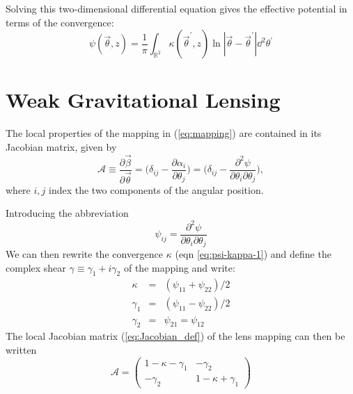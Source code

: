 Solving this two-dimensional differential equation gives the effective potential in terms of the convergence:
\begin{equation}
  \label{eq:psi-kappa}
  \psi(\vec{\theta},z) 
  = \frac{1}{\pi}\int_{\mathbb{R}^2} \kappa(\vec{\theta}^\prime,z) 
  \ln|\vec{\theta} - \vec{\theta}^\prime|\dd^2\theta^\prime
\end{equation}

\section{Weak Gravitational Lensing}

The local properties of the mapping in (\ref{eq:mapping}) are contained in its Jacobian matrix, given by
\begin{equation}
  \label{eq:Jacobian_def}
  \mathcal{A} \equiv \frac{\partial \vec{\beta}}{\partial \vec{\theta}} = \Big(\delta_{ij} - \frac{\partial \alpha_i}{\partial \theta_j} \Big) = \Big(\delta_{ij} - \frac{\partial^2 \psi}{\partial \theta_i \partial \theta_j} \Big),
\end{equation}
where $i,j$ index the two components of the angular position.

Introducing the abbreviation
\begin{equation}
  \label{eq:psi_ij}
  \psi_{ij} = \frac{\partial^2 \psi}{\partial \theta_i \partial \theta_j}
\end{equation}
We can then rewrite the convergence $\kappa$ (eqn \ref{eq:psi-kappa-1}) and define the complex shear $\gamma \equiv \gamma_1 + i\gamma_2$ of the mapping and write:
\begin{equation}
  \label{eq:gamma-def}
  \begin{array}{lcl}
    \kappa & = & (\psi_{11} + \psi_{22})/2\\
    \gamma_1 & = & (\psi_{11} - \psi_{22})/2\\
    \gamma_2 & = & \psi_{21} = \psi_{12}
  \end{array}
\end{equation}
The local Jacobian matrix (\ref{eq:Jacobian_def}) of the lens mapping can then be written
\begin{equation}
  \label{eq:jacobian_kappa_gamma}
  \mathcal{A} = \left(
  \begin{array}{cc}
    1 - \kappa - \gamma_1 & -\gamma_2\\
    -\gamma_2             & 1-\kappa+\gamma_1
  \end{array}\right)
\end{equation}

